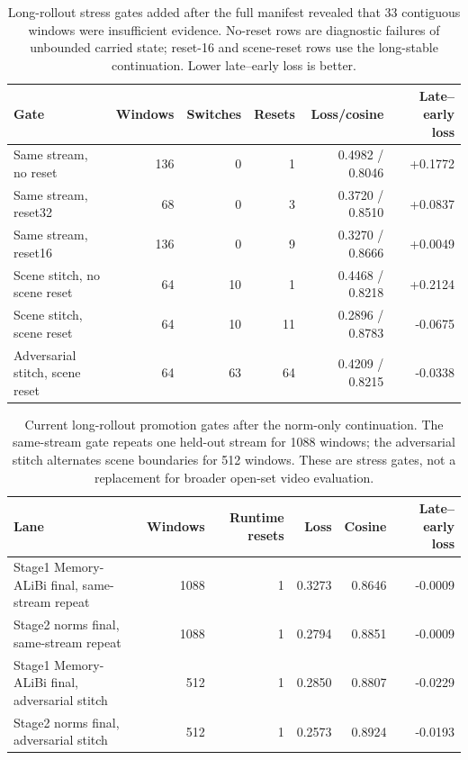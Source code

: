 \documentclass[10pt]{article}
\begin{document}
\begin{table}[t]
\centering
\scriptsize
\setlength{\tabcolsep}{3pt}
\caption{Long-rollout stress gates added after the full manifest revealed that
33 contiguous windows were insufficient evidence.  No-reset rows are diagnostic
failures of unbounded carried state; reset-16 and scene-reset rows use the
long-stable continuation.  Lower late--early loss is better.}
\label{tab:stress}
\begin{tabular}{lrrrrr}
\toprule
Gate & Windows & Switches & Resets & Loss/cosine & Late--early loss \\
\midrule
Same stream, no reset & 136 & 0 & 1 & 0.4982 / 0.8046 & +0.1772 \\
Same stream, reset32 & 68 & 0 & 3 & 0.3720 / 0.8510 & +0.0837 \\
Same stream, reset16 & 136 & 0 & 9 & 0.3270 / 0.8666 & +0.0049 \\
Scene stitch, no scene reset & 64 & 10 & 1 & 0.4468 / 0.8218 & +0.2124 \\
Scene stitch, scene reset & 64 & 10 & 11 & 0.2896 / 0.8783 & -0.0675 \\
Adversarial stitch, scene reset & 64 & 63 & 64 & 0.4209 / 0.8215 & -0.0338 \\
\bottomrule
\end{tabular}
\end{table}

\begin{table}[t]
\centering
\scriptsize
\setlength{\tabcolsep}{3pt}
\caption{Current long-rollout promotion gates after the norm-only continuation.
The same-stream gate repeats one held-out stream for 1088 windows; the
adversarial stitch alternates scene boundaries for 512 windows.  These are
stress gates, not a replacement for broader open-set video evaluation.}
\label{tab:stage2-long}
\begin{tabular}{lrrrrr}
\toprule
Lane & Windows & Runtime resets & Loss & Cosine & Late--early loss \\
\midrule
Stage1 Memory-ALiBi final, same-stream repeat & 1088 & 1 & 0.3273 & 0.8646 & -0.0009 \\
Stage2 norms final, same-stream repeat & 1088 & 1 & 0.2794 & 0.8851 & -0.0009 \\
Stage1 Memory-ALiBi final, adversarial stitch & 512 & 1 & 0.2850 & 0.8807 & -0.0229 \\
Stage2 norms final, adversarial stitch & 512 & 1 & 0.2573 & 0.8924 & -0.0193 \\
\bottomrule
\end{tabular}
\end{table}
\end{document}
